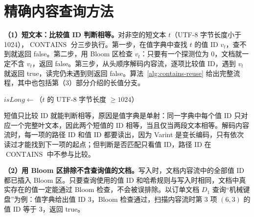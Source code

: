 \section{精确内容查询方法}
\textbf{（1）短文本：比较值 ID 判断相等。}对非空的短文本 $t$（UTF-8 字节长度小于 1024），$\operatorname{CONTAINS}$ 分三步执行。第一步，在值字典中查找 $t$ 的值 ID $v_t$，查不到就返回 false。第二步，用 Bloom 区检查 $v_t$：只要有一个探测位为 0，文档就一定不含 $v_t$，返回 false。第三步，从头顺序解码内容流，逐项比较值 ID，遇到 $v_t$ 就返回 true，读完仍未遇到则返回 false。算法~\ref{alg:contains-reuse} 给出完整流程，其中也包括第（3）部分介绍的长值分支。

\begin{algorithm}[htbp]
\caption{复用值 ID 的精确内容查询 $\textsc{Contains}$}
\label{alg:contains-reuse}
$\mathit{isLong}\leftarrow$（$t$ 的 UTF-8 字节长度 $\ge1024$）\;
\;
\end{algorithm}

短值只比较 ID 就能判断相等，原因是值字典是单射：同一字典中每个值 ID 只对应一个完整叶文本，因此两个短值的 ID 相等，当且仅当两段文本相等。解码内容流时，每一项的路径 ID 和值 ID 都要读出，因为 Varint 是变长编码，只有依次读过才能找到下一项的起点；但判断是否匹配只看值 ID，路径 ID 在 $\operatorname{CONTAINS}$ 中不参与比较。

\textbf{（2）用 Bloom 区排除不含查询值的文档。}写入时，文档内容流中的全部值 ID 都已插入 Bloom 区。只要查询使用的值 ID 和哈希规则与写入时相同，文档中真实存在的值一定能通过 Bloom 检查，不会被误排除\cite{bloom1970space}。以订单文档 $D_1$ 查询“机械键盘”为例：值字典给出值 ID 3，Bloom 检查通过，扫描内容流时第 3 项 $(6,3)$ 的值 ID 等于 3，返回 true。

